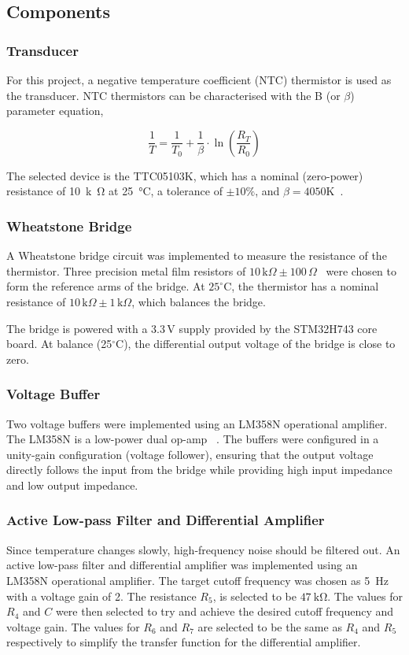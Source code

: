 \documentclass[12pt,a4paper]{article}
\begin{document}
\subsection{Components}
\subsubsection{Transducer}
For this project, a negative temperature coefficient (NTC) thermistor is used as the transducer. NTC thermistors can be characterised with the B (or $\beta$) parameter equation,

\begin{equation}
    \label{eq:thermistor}
    \frac{1}{T} = \frac{1}{T_0} + \frac{1}{\beta} \cdot \ln{\left(\frac{R_T}{R_0}\right)}
\end{equation}

The selected device is the TTC05103K, which has a nominal (zero-power) resistance of 
\SI{10}{k\ohm} at \SI{25}{\celsius}, a tolerance of $\pm 10\%$, and $\beta=4050 \text{K}$~\cite{thermistor}. 

\subsubsection{Wheatstone Bridge}
A Wheatstone bridge circuit was implemented to measure the resistance of the thermistor.  
Three precision metal film resistors of $10\,\text{k}\Omega \pm 100\,\Omega$~\cite{resistor} were chosen to form the reference arms of the bridge.  
At $25^{\circ}\text{C}$, the thermistor has a nominal resistance of $10\,\text{k}\Omega \pm 1\,\text{k}\Omega$,  
which balances the bridge.  

The bridge is powered with a $3.3\,\text{V}$ supply provided by the STM32H743 core board.  
At balance (25$^{\circ}$C), the differential output voltage of the bridge is close to zero.  

\subsubsection{Voltage Buffer}
Two voltage buffers were implemented using an LM358N operational amplifier. The LM358N is a low-power dual op-amp ~\cite{op-amp}. The buffers were configured in a unity-gain configuration (voltage follower), ensuring that the output voltage directly follows the input from the bridge while providing high input impedance and low output impedance.

\subsubsection{Active Low-pass Filter and Differential Amplifier}
Since temperature changes slowly, high-frequency noise should be filtered out. An active low-pass filter and differential amplifier was implemented using an LM358N operational amplifier.  
The target cutoff frequency was chosen as \SI{5}{Hz} with a voltage gain of 2. The resistance $R_5$, is selected to be $\SI{47}{\kilo\ohm}$. The values for $R_4$ and $C$ were then selected to try and achieve the desired cutoff frequency and voltage gain. The values for $R_6$ and $R_7$ are selected to be the same as $R_4$ and $R_5$ respectively to simplify the transfer function for the differential amplifier.
\end{document}
